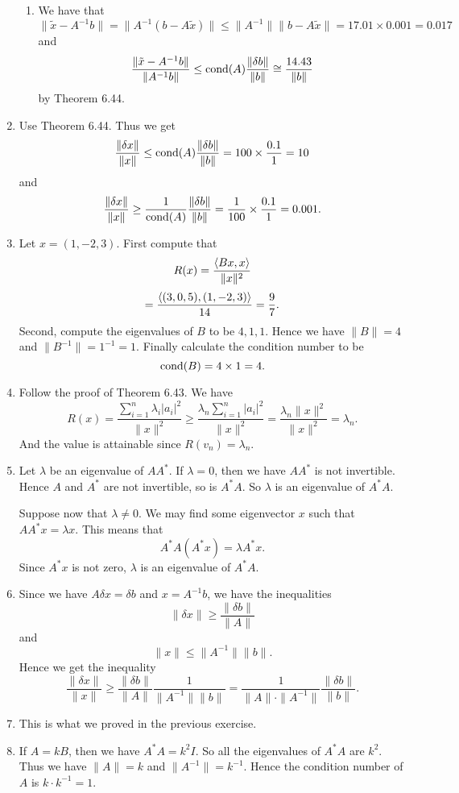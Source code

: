 \begin{enumerate}
\begin{enumerate}
\item We have that 
\[\|\tilde{x}-A^{-1}b\|=\|A^{-1}(b-A\tilde{x})\|\leq \|A^{-1}\|\|b-A\tilde{x}\|=17.01\times 0.001=0.017\]
and 
\[\frac{\|\tilde{x}-A^{-1}b\|}{\|A^{-1}b\|}\leq \operatorname{cond}(A)\frac{\|\delta b\|}{\|b\|}\cong \frac{14.43}{\|b\|}\]
by Theorem 6.44.
\end{enumerate}
\item Use Theorem 6.44. Thus we get 
\[\frac{\|\delta x\|}{\|x\|}\leq \operatorname{cond}(A)\frac{\|\delta b\|}{\|b\|}=100\times \frac{0.1}{1}=10\]
and 
\[\frac{\|\delta x\|}{\|x\|}\geq \frac{1}{\operatorname{cond}(A)}\frac{\|\delta b\|}{\|b\|}=\frac{1}{100}\times \frac{0.1}{1}=0.001.\]
\item Let $x=(1,-2,3)$. First compute that 
\[R(x)=\frac{\langle Bx,x\rangle}{\|x\|^2}\]
\[=\frac{\langle (3,0,5),(1,-2,3)\rangle}{14}=\frac{9}{7}.\]
Second, compute the eigenvalues of $B$ to be $4,1,1$. Hence we have $\|B\|=4$ and $\|B^{-1}\|=1^{-1}=1$. Finally calculate the condition number to be 
\[\operatorname{cond}(B)=4\times 1=4.\]
\item Follow the proof of Theorem 6.43. We have 
\[R(x)=\frac{\sum_{i=1}^n{\lambda_i|a_i|^2}}{\|x\|^2}\geq \frac{\lambda_n\sum_{i=1}^n{|a_i|^2}}{\|x\|^2}=\frac{\lambda_n\|x\|^2}{\|x\|^2}=\lambda_n.\]
And the value is attainable since $R(v_n)=\lambda_n$.
\item Let $\lambda$ be an eigenvalue of $AA^*$. If $\lambda=0$, then we have $AA^*$ is not invertible. Hence $A$ and $A^*$ are not invertible, so is $A^*A$. So $\lambda$ is an eigenvalue of $A^*A$.

Suppose now that $\lambda\neq 0$. We may find some eigenvector $x$ such that $AA^*x=\lambda x$. This means that 
\[A^*A(A^*x)=\lambda A^*x.\]
Since $A^*x$ is not zero, $\lambda$ is an eigenvalue of $A^*A$.
\item Since we have $A\delta x=\delta b$ and $x=A^{-1}b$, we have the inequalities 
\[\|\delta x\|\geq \frac{\|\delta b\|}{\|A\|}\]
and 
\[\|x\|\leq \|A^{-1}\|\|b\|.\]
Hence we get the inequality 
\[\frac{\|\delta x\|}{\|x\|}\geq \frac{\|\delta b\|}{\|A\|}\frac{1}{\|A^{-1}\|\|b\|}=\frac{1}{\|A\|\cdot \|A^{-1}\|}\frac{\|\delta b\|}{\|b\|}.\]
\item This is what we proved in the previous exercise.
\item If $A=kB$, then we have $A^*A=k^2I$. So all the eigenvalues of $A^*A$ are $k^2$. Thus we have $\|A\|=k$ and $\|A^{-1}\|=k^{-1}$. Hence the condition number of $A$ is $k\cdot k^{-1}=1$.


\end{enumerate}
